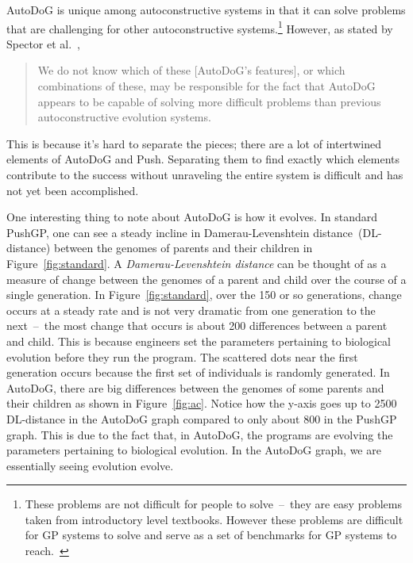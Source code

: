 \documentclass{sig-alternate}
\begin{document}
AutoDoG is unique among autoconstructive systems in that it can solve problems that are challenging for other autoconstructive systems.\footnote{These problems are not difficult for people to solve~--~they are easy problems taken from introductory level textbooks. However these problems are difficult for GP systems to solve and serve as a set of benchmarks for GP systems to reach.~\cite{helmuth:2015}} However, as stated by Spector et al.~\cite{spector:2016},
\begin{quotation}
	We do not know which of these [AutoDoG's features], or which combinations of these, may be responsible for the fact that AutoDoG appears to be capable of solving more difficult problems than previous autoconstructive evolution systems.
\end{quotation}
This is because it's hard to separate the pieces; there are a lot of intertwined elements of AutoDoG and Push. Separating them to find exactly which elements contribute to the success without unraveling the entire system is difficult and has not yet been accomplished.

One interesting thing to note about AutoDoG is how it evolves. In standard PushGP, one can see a steady incline in Damerau-Levenshtein distance~(DL-distance) between the genomes of parents and their children in Figure~\ref{fig:standard}. A \textit{Damerau-Levenshtein distance} can be thought of as a measure of change between the genomes of a parent and child over the course of a single generation. In Figure~\ref{fig:standard}, over the 150 or so generations, change occurs at a steady rate and is not very dramatic from one generation to the next~--~the most change that occurs is about 200 differences between a parent and child. This is because engineers set the parameters pertaining to biological evolution before they run the program. The scattered dots near the first generation occurs because the first set of individuals is randomly generated. In AutoDoG, there are big differences between the genomes of some parents and their children as shown in Figure~\ref{fig:ac}. Notice how the y-axis goes up to 2500 DL-distance in the AutoDoG graph compared to only about 800 in the PushGP graph. This is due to the fact that, in AutoDoG, the programs are evolving the parameters pertaining to biological evolution. In the AutoDoG graph, we are essentially seeing evolution evolve.
\end{document}
